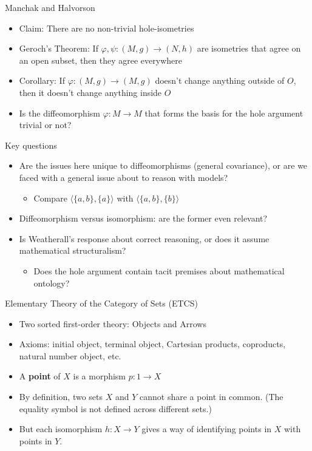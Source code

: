 \documentclass{beamer}
\begin{document}
\begin{frame}{Manchak and Halvorson}

  \begin{itemize}
  \item Claim: There are no non-trivial hole-isometries
  \item Geroch's Theorem: If $\varphi ,\psi :(M,g)\to (N,h)$ are
    isometries that agree on an open subset, then they agree
    everywhere
  \item Corollary: If $\varphi :(M,g)\to (M,g)$ doesn't change
    anything outside of $O$, then it doesn't change anything inside
    $O$
  \item Is the diffeomorphism $\varphi :M\to M$ that forms the basis
    for the hole argument trivial or not?
  \end{itemize}


\end{frame}

\begin{frame}{Key questions}

  \begin{itemize}
  \item Are the issues here unique to diffeomorphisms (general
    covariance), or are we faced with a general issue about to reason
    with models?
    \begin{itemize} \item Compare $\langle \{ a,b\} ,\{ a\} \rangle$
      with $\langle \{ a,b\} ,\{ b\} \rangle$ \end{itemize}
  \item Diffeomorphism versus isomorphism: are the former even
    relevant?
  \item Is Weatherall's response about correct reasoning, or does it
    assume mathematical structuralism?
    \begin{itemize} \item Does the hole argument contain tacit
      premises about mathematical ontology? \end{itemize}
  \end{itemize}


\end{frame}


\begin{frame}{Elementary Theory of the Category of Sets (ETCS)}

  \begin{itemize}
  \item Two sorted first-order theory: Objects and Arrows
  \item Axioms: initial object, terminal object, Cartesian products,
    coproducts, natural number object, etc.
  \item A \textbf{point} of $X$ is a morphism $p:1\to X$
  \item By definition, two sets $X$ and $Y$ cannot share a point in
    common. (The equality symbol is not defined across different
    sets.)
  \item But each isomorphism $h:X\to Y$ gives a way of identifying
    points in $X$ with points in $Y$.
  \end{itemize}


\end{frame}
\end{document}

